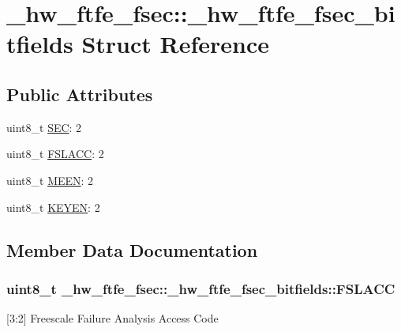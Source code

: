 \hypertarget{struct__hw__ftfe__fsec_1_1__hw__ftfe__fsec__bitfields}{}\section{\+\_\+hw\+\_\+ftfe\+\_\+fsec\+:\+:\+\_\+hw\+\_\+ftfe\+\_\+fsec\+\_\+bitfields Struct Reference}
\label{struct__hw__ftfe__fsec_1_1__hw__ftfe__fsec__bitfields}
\subsection*{Public Attributes}
\begin{DoxyCompactItemize}
\item 
uint8\+\_\+t \hyperlink{struct__hw__ftfe__fsec_1_1__hw__ftfe__fsec__bitfields_a19409c557e2977e71cb2ab7208cace59}{S\+EC}\+: 2
\item 
uint8\+\_\+t \hyperlink{struct__hw__ftfe__fsec_1_1__hw__ftfe__fsec__bitfields_a69f05c6d46c5655b0bcf838472067eb7}{F\+S\+L\+A\+CC}\+: 2
\item 
uint8\+\_\+t \hyperlink{struct__hw__ftfe__fsec_1_1__hw__ftfe__fsec__bitfields_a5998aeaa207e34467be791eaa99ff047}{M\+E\+EN}\+: 2
\item 
uint8\+\_\+t \hyperlink{struct__hw__ftfe__fsec_1_1__hw__ftfe__fsec__bitfields_ad4d38f27dbb333905bff4ee78ea8a4b3}{K\+E\+Y\+EN}\+: 2
\end{DoxyCompactItemize}


\subsection{Member Data Documentation}
\subsubsection[{\texorpdfstring{F\+S\+L\+A\+CC}{FSLACC}}]{\setlength{\rightskip}{0pt plus 5cm}uint8\+\_\+t \+\_\+hw\+\_\+ftfe\+\_\+fsec\+::\+\_\+hw\+\_\+ftfe\+\_\+fsec\+\_\+bitfields\+::\+F\+S\+L\+A\+CC}\hypertarget{struct__hw__ftfe__fsec_1_1__hw__ftfe__fsec__bitfields_a69f05c6d46c5655b0bcf838472067eb7}{}\label{struct__hw__ftfe__fsec_1_1__hw__ftfe__fsec__bitfields_a69f05c6d46c5655b0bcf838472067eb7}
\mbox{[}3\+:2\mbox{]} Freescale Failure Analysis Access Code 

